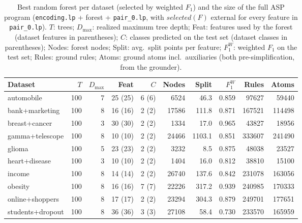 \begin{table}[t]
\centering
\caption{Best random forest per dataset (selected by weighted $F_1$) and the size of the full ASP program (\texttt{encoding.lp} + forest + \texttt{pair\_0.lp}, with $\mathit{selected}(F)$ external for every feature in \texttt{pair\_0.lp}). $T$: trees; $D_{\max}$: realized maximum tree depth; Feat: features used by the forest (dataset features in parentheses); $C$: classes predicted on the test set (dataset classes in parentheses); Nodes: forest nodes; Split: avg.\ split points per feature; $F_1^{W}$: weighted $F_1$ on the test set; Rules: ground rules; Atoms: ground atoms incl.\ auxiliaries (both pre-simplification, from the grounder).}
\label{tab:model-info}
\small
\begin{tabular}{lrrrrrrrrr}
\toprule
Dataset & $T$ & $D_{\max}$ & Feat & $C$ & Nodes & Split & $F_1^{W}$ & Rules & Atoms \\
\midrule
automobile & 100 & 7 & 25 (25) & 6 (6) & 6524 & 46.3 & 0.859 & 97627 & 59440 \\
bank+marketing & 100 & 8 & 16 (16) & 2 (2) & 17586 & 111.8 & 0.871 & 167521 & 114498 \\
breast+cancer & 100 & 3 & 30 (30) & 2 (2) & 1334 & 17.0 & 0.965 & 43827 & 18956 \\
gamma+telescope & 100 & 8 & 10 (10) & 2 (2) & 24466 & 1103.1 & 0.851 & 333607 & 241490 \\
glioma & 100 & 5 & 23 (23) & 2 (2) & 3232 & 8.5 & 0.875 & 48038 & 23527 \\
heart+disease & 100 & 3 & 10 (10) & 2 (2) & 1404 & 16.0 & 0.812 & 38810 & 15100 \\
income & 100 & 8 & 14 (14) & 2 (2) & 26740 & 137.6 & 0.842 & 231078 & 163056 \\
obesity & 100 & 8 & 16 (16) & 7 (7) & 22226 & 317.2 & 0.939 & 240985 & 170333 \\
online+shoppers & 100 & 8 & 17 (17) & 2 (2) & 23294 & 304.3 & 0.879 & 249701 & 177651 \\
students+dropout & 100 & 8 & 36 (36) & 3 (3) & 27108 & 58.4 & 0.730 & 233570 & 165959 \\
\bottomrule
\end{tabular}
\end{table}
